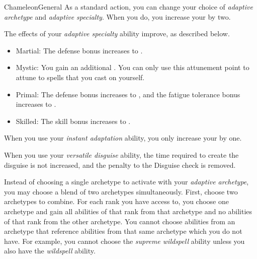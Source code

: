 \begin{feat}{Chameleon}{General}
         As a standard action, you can change your choice of \textit{adaptive archetype} and \textit{adaptive specialty}.
        When you do, you increase your  by two.

         The effects of your \textit{adaptive specialty} ability improve, as described below.
        \begin{itemize}
            \item Martial: The defense bonus increases to .
            \item Mystic: You gain an additional .
                You can only use this attunement point to attune to spells that you cast on yourself.
            \item Primal: The defense bonus increases to , and the fatigue tolerance bonus increases to .
            \item Skilled: The skill bonus increases to .
        \end{itemize}

         When you use your \textit{instant adaptation} ability,
        you only increase your  by one.

         When you use your \textit{versatile disguise} ability, the time required to create the disguise is not increased, and the penalty to the Disguise check is removed.

         Instead of choosing a single archetype to activate with your \textit{adaptive archetype}, you may choose a blend of two archetypes simultaneously.
        First, choose two archetypes to combine.
        For each rank you have access to, you choose one archetype and gain all abilities of that rank from that archetype and no abilities of that rank from the other archetype.
        You cannot choose abilities from an archetype that reference abilities from that same archetype which you do not have.
        For example, you cannot choose the \textit{supreme wildspell} ability unless you also have the \textit{wildspell} ability.
    \end{feat}

